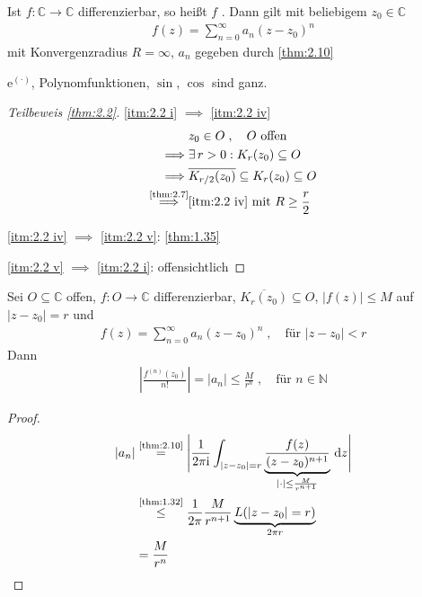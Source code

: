 \begin{theorem}[Definition] \label{thm:2.11}
  Ist $f:\mathbb{C} \to \mathbb{C}$ differenzierbar, so heißt $f$ . Dann gilt mit beliebigem $z_0 \in \mathbb{C}$
  \begin{align*}
    f(z) = \sum\limits_{n=0}^{\infty} a_n (z-z_0)^n
  \end{align*}
  mit Konvergenzradius $R = \infty$, $a_n$ gegeben durch \ref{thm:2.10}
\end{theorem}

\begin{example}
  $\mathrm{e}^{(\cdot)}$, Polynomfunktionen, $\sin$, $\cos$ sind ganz.
\end{example}

\begin{proof}[Teilbeweis \ref{thm:2.2}]
  \ref{itm:2.2 i} $\implies$ \ref{itm:2.2 iv}
  \begin{align*}
    & z_0 \in O \; , \quad O \text{ offen} \\
    \implies& \exists \, r > 0 : K_r(z_0) \subseteq O \\
    \implies& \overline{K_{r/2}(z_0)} \subseteq K_r(z_0) \subseteq O \\
    \overset{\text{\ref{thm:2.7}}}{\implies}& \text{\ref{itm:2.2 iv}} \text{ mit } R \geq \frac{r}{2}
  \end{align*}
  
  \ref{itm:2.2 iv} $\implies$ \ref{itm:2.2 v}: \ref{thm:1.35}
  
  \ref{itm:2.2 v} $\implies$ \ref{itm:2.2 i}: offensichtlich
\end{proof}

\begin{theorem} \label{thm:2.13}
  Sei $O \subseteq \mathbb{C}$ offen, $f:O \to \mathbb{C}$ differenzierbar, $\overline{K_r(z_0)} \subseteq O$, $|f(z)| \leq M$ auf $|z-z_0| = r$ und
  \begin{align*}
    f(z) = \sum\limits_{n=0}^{\infty} a_n (z-z_0)^n \; , \quad \text{für } |z-z_0| < r
  \end{align*}
  Dann
  \begin{align*}
    \left| \frac{f^{(n)}(z_0)}{n!} \right| = |a_n| \leq \frac{M}{r^n} \; , \quad \text{für } n \in \mathbb{N}
  \end{align*}
  
  \begin{proof}
    \begin{align*}
      |a_n| &\overset{\text{\ref{thm:2.10}}}{=} \Bigg| \frac{1}{2 \pi \mathrm{i}} \int_{|z-z_0| = r} \underbrace{\frac{f(z)}{(z-z_0)^{n+1}}}_{|\cdot| \leq \frac{M}{r^{n+1}}} \, \mathrm{d}z \Bigg| \\
      &\overset{\text{\ref{thm:1.32}}}{\leq} \frac{1}{2 \pi} \frac{M}{r^{n+1}} \underbrace{L(|z-z_0| = r)}_{2 \pi r} \\
      &= \frac{M}{r^n}
    \end{align*}
  \end{proof}
\end{theorem}

